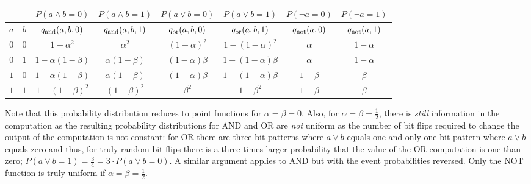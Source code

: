 \begin{center}
    \begin{tabular}{c|c||c|c||c|c||c|c}
        \multicolumn{2}{c||}{}         &
        $P\left(a \land b = 0\right)$  & $P\left(a \land b = 1\right)$  &
        $P\left(a \lor b = 0\right)$   & $P\left(a \lor b = 1\right)$   &
        $P\left(\neg a = 0\right)$     & $P\left(\neg a = 1\right)$       \\
        \hline
        $a$                            & $b$                            &
        $q_{\mathrm{and}}(a,b,0)$                & $q_{\mathrm{and}}(a,b,1)$                &
        $q_{\mathrm{or}}(a,b,0) $                & $q_{\mathrm{or}}(a,b,1)$                 &
        $q_{\mathrm{not}}(a,0)$                  & $q_{\mathrm{not}}(a,1)$                    \\
        \hline
        $0$                            & $0$                            &
        $1-\alpha^2$                   & $\alpha^2$                     &
        $\left(1-\alpha\right)^2$      & $1-\left(1-\alpha\right)^2$    &
        $\alpha$                       & $1-\alpha$                       \\
        $0$                            & $1$                            &
        $1-\alpha\left(1-\beta\right)$ & $\alpha\left(1-\beta\right)$   &
        $\left(1-\alpha\right)\beta$   & $1-\left(1-\alpha\right)\beta$ &
        $\alpha$                       & $1-\alpha$                       \\
        $1$                            & $0$                            &
        $1-\alpha\left(1-\beta\right)$ & $\alpha\left(1-\beta\right)$   &
        $\left(1-\alpha\right)\beta$   & $1-\left(1-\alpha\right)\beta$ &
        $1-\beta$                      & $\beta$                          \\
        $1$                            & $1$                            &
        $1-\left(1-\beta\right)^2$     & $\left(1-\beta\right)^2$       &
        $\beta^2$                      & $1-\beta^2$                    &
        $1-\beta$                      & $\beta$                          \\
    \end{tabular}
\end{center}

Note that this probability distribution reduces to point functions for $\alpha = \beta = 0$. Also, for $\alpha = \beta = \frac{1}{2}$, there is {\em still} information in the computation as the resulting probability distributions for AND and OR are {\em not} uniform as the number of bit flips required to change the output of the computation is not constant: for OR there are three bit patterns where $a \lor b$ equals one and only one bit pattern where $a \lor b$ equals zero and thus, for truly random bit flips there is a three times larger probability that the value of the OR computation is one than zero; $P(a \lor b = 1)=\frac{3}{4}=3\cdot P(a \lor b = 0)$. A similar argument applies to AND but with the event probabilities reversed. Only the NOT function is truly uniform if $\alpha = \beta = \frac{1}{2}$.

